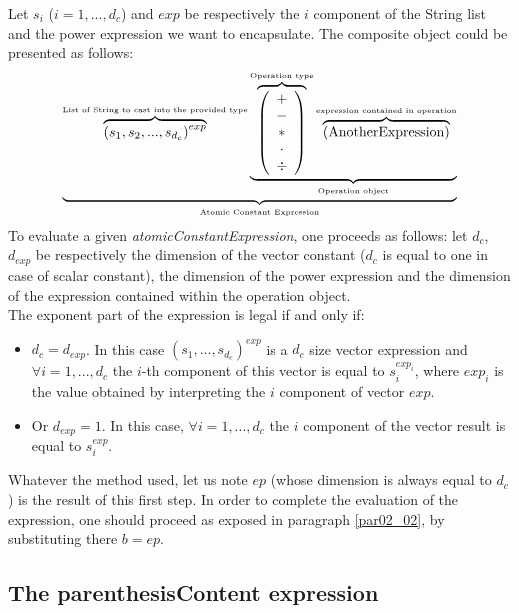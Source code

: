 \documentclass[a4paper,11pt] {ivoa}
\begin{document}
Let $s_i$ ($i=1,...,d_c$) and $exp$ be respectively the $i$ component of the String list and the
power expression we want to encapsulate. The composite object could be presented as follows:
\begin{equation}
 \underbrace{    \overbrace{ \left( s_1  , s_2, ..., s_{d_c}\right)^{exp} }^{\mbox{\tiny List of String  to cast into the provided type}}   \underbrace{  \overbrace{\left( \begin{array}{c} + \\ - \\ \ast  \\ \cdot \\ \div   \end{array} \right) }^{\mbox{\tiny Operation type}}
 \overbrace{    \left( \mbox{AnotherExpression}\right) }^{\mbox{\tiny expression contained in operation}}   }_{\mbox{\tiny Operation object}}}_{\mbox{\tiny Atomic Constant Expression}}
\end{equation}
To evaluate a given {\it atomicConstantExpression}, one proceeds as follows: let $d_c$, $d_{exp}$
be respectively the dimension of the vector constant ($d_c$ is equal to one in case of scalar constant),
the dimension of the power expression and the dimension of the expression contained within the operation object.\\
The exponent part of the expression is legal if and only if:
\begin{itemize}
\item $d_c = d_{exp}$. In this case $(s_1,...,s_{d_c})^{exp}$ is a $d_c$ size vector expression and
$\forall i =1,...,d_c$ the $i$-th component of this vector is equal to $s_i^{exp_i}$, where $exp_i$
is the value obtained by interpreting the $i$ component of vector $exp$.
\item Or $d_{exp}=1$. In this case, $\forall i =1,...,d_c$ the $i$ component of the vector result is
equal to $s_i^{exp}$.\\
\end{itemize}
Whatever the method used, let us note $ep$ (whose dimension is always equal to $d_c$)  is the result
of this first step.  In order to complete the evaluation of the expression, one should proceed as
exposed in paragraph \ref{par02_02}, by substituting there $b=ep$.


\subsection{The parenthesisContent expression}\label{par02_04}
\end{document}

